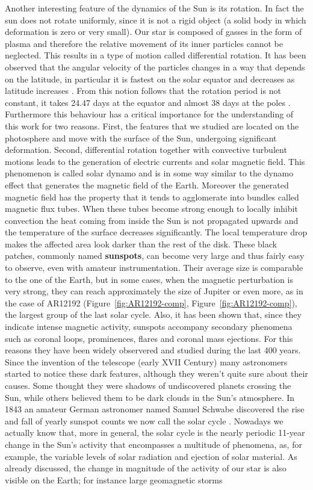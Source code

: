 Another interesting feature of the dynamics of the Sun is its rotation. In fact the sun does not rotate uniformly, since it is not a rigid object (a solid body in which deformation is zero or very small). Our star is composed of gasses in the form of plasma and therefore the relative movement of its inner particles cannot be neglected. This results in a type of motion called differential rotation. It has been observed that the angular velocity of the particles changes in a way that depends on the latitude, in particular it is fastest on the solar equator and decreases as latitude increases \cite{diffrot}. From this notion follows that the rotation period is not constant, it takes 24.47 days at the equator and almost 38 days at the poles \cite{diffrotrev}. Furthermore this behaviour has a critical importance for the understanding of this work for two reasons. First, the features that we studied are located on the photosphere and move with the surface of the Sun, undergoing significant deformation. Second, differential rotation together with convective turbulent motions leads to the generation of electric currents and solar magnetic field. This phenomenon is called solar dynamo and is in some way similar to the dynamo effect that generates the magnetic field of the Earth. Moreover the generated magnetic field has the property that it tends to agglomerate into bundles called magnetic flux tubes. When these tubes become strong enough to locally inhibit convection the heat coming from inside the Sun is not propagated upwards and the temperature of the surface decreases significantly. The local temperature drop makes the affected area look darker than the rest of the disk. These black patches, commonly named \textbf{sunspots}, can become very large and thus fairly easy to observe, even with amateur instrumentation. Their average size is comparable to the one of the Earth, but in some cases, when the magnetic perturbation is very strong, they can reach approximately the size of Jupiter or even more, as in the case of AR12192 (Figure~\ref{fig:AR12192-comp}, Figure~\ref{fig:AR12192-comp}), the largest group of the last solar cycle. Also, it has been shown that, since they indicate intense magnetic activity, sunspots accompany secondary phenomena such as coronal loops, prominences, flares and coronal mass ejections. For this reasons they have been widely observered and studied during the last 400 years. Since the invention of the telescope \cite{king2003history} (early XVII Century) many astronomers started to notice these dark features, although they weren't quite sure about their causes. Some thought they were shadows of undiscovered planets crossing the Sun, while others believed them to be dark clouds in the Sun's atmosphere. In 1843 an amateur German astronomer named Samuel Schwabe discovered the rise and fall of yearly sunspot counts we now call the solar cycle \cite{schwabe1843solar}. Nowadays we actually know that, more in general, the solar cycle is the nearly periodic 11-year change in the Sun's activity that encompasses a multitude of phenomena, as, for example, the variable levels of solar radiation and ejection of solar material. As already discussed, the change in magnitude of the activity of our star is also visible on the Earth; for instance large geomagnetic storms 
